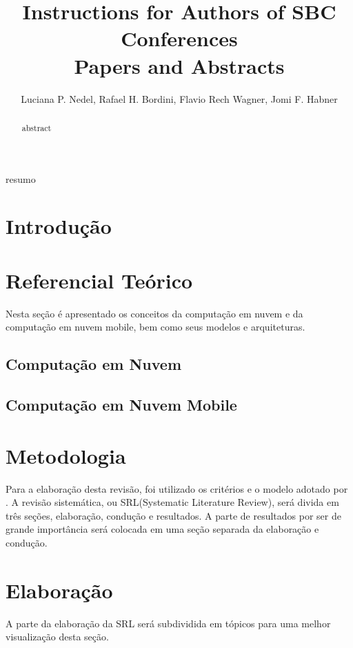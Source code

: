 \documentclass[12pt]{article}
\title{Instructions for Authors of SBC Conferences\\ Papers and Abstracts}
\author{Luciana P. Nedel\inst{1}, Rafael H. Bordini\inst{2}, Flavio Rech
  Wagner\inst{1}, Jomi F. Habner\inst{3} }
\begin{document}
 

\maketitle

\begin{abstract}
  abstract
\end{abstract}
     
\begin{resumo} 
  resumo
\end{resumo}


\section{Introdução}

\lipsum[1]

\section{Referencial Teórico}

Nesta seção é apresentado os conceitos da computação em nuvem e da computação em nuvem
mobile, bem como seus modelos e arquiteturas.

\subsection{Computação em Nuvem}

\subsection{Computação em Nuvem Mobile}

\section{Metodologia}

Para a elaboração desta revisão, foi utilizado os critérios e o modelo adotado por \cite{kitchenham2012}. A revisão sistemática, ou SRL(Systematic Literature Review), será divida em três seções, elaboração, condução e resultados. A parte de resultados por ser de grande importância será colocada em uma seção separada da elaboração e condução.

\section{Elaboração}
A parte da elaboração da SRL será subdividida em tópicos para uma melhor visualização desta seção.
\end{document}
